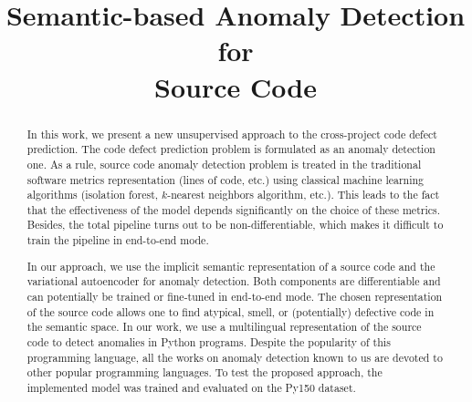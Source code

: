 \documentclass[conference]{ieeetran}
\begin{document}
\title{Semantic-based Anomaly Detection for \\ Source Code}

\author{
}
\maketitle

\begin{abstract}
In this work, we present a new unsupervised approach to the cross-project code defect prediction.
The code defect prediction problem is formulated as an anomaly detection one.
As a rule, source code anomaly detection problem is treated in the traditional software metrics representation (lines of code, etc.)
 using classical machine learning algorithms (isolation forest, $k$-nearest neighbors algorithm, etc.).
This leads to the fact that the effectiveness of the model depends significantly on the choice of these metrics.
Besides, the total pipeline turns out to be non-differentiable, which makes it difficult to train the pipeline in end-to-end mode.

In our approach, we use the implicit semantic representation of a source code
 and the variational autoencoder for anomaly detection.
Both components are differentiable and can potentially be trained or fine-tuned in end-to-end mode.
The chosen representation of the source code allows one to find atypical, smell, or (potentially) defective code in the semantic space.
In our work, we use a multilingual representation of the source code to detect anomalies in Python programs.
Despite the popularity of this programming language,
 all the works on anomaly detection known to us are devoted to other popular programming languages.
To test the proposed approach, the implemented model was trained and evaluated on the Py150 dataset.
\end{abstract}
\end{document}
